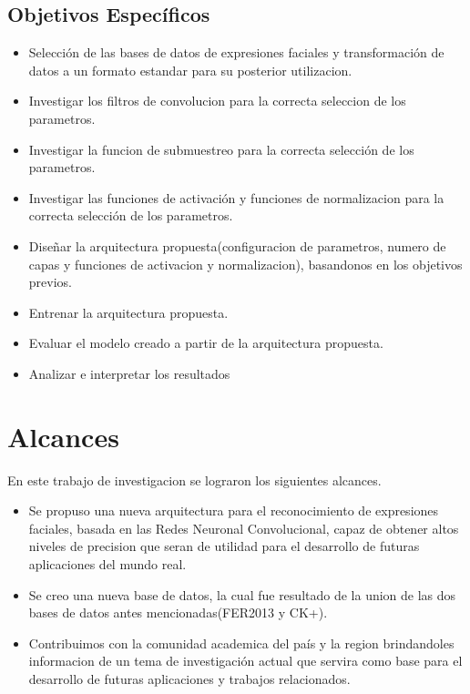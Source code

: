 \subsection{Objetivos Específicos}
\begin{itemize}
\item Selección de las bases de datos de expresiones faciales y transformación de datos a un formato estandar para su posterior utilizacion.
\item Investigar los filtros de convolucion para la correcta seleccion de los parametros.
\item Investigar la funcion de submuestreo para la correcta selección de los parametros. 
\item Investigar las funciones de activación y funciones de normalizacion para la correcta selección de los parametros.
\item Diseñar la arquitectura propuesta(configuracion de parametros, numero de capas y funciones de activacion y normalizacion), basandonos en los objetivos previos.
\item Entrenar la arquitectura propuesta.	
\item Evaluar el modelo creado a partir de la arquitectura propuesta.
\item Analizar e interpretar los resultados
\end{itemize}

\section{Alcances}
En este trabajo de investigacion se lograron los siguientes alcances.

\begin{itemize}
\item Se propuso una nueva arquitectura para el reconocimiento de expresiones faciales, basada en las Redes Neuronal Convolucional, capaz de obtener altos niveles de precision que seran de utilidad para el desarrollo de futuras aplicaciones del mundo real.
\item Se creo una nueva base de datos, la cual fue resultado de la union de las dos bases de datos antes mencionadas(FER2013 y CK+).
\item Contribuimos con la comunidad academica del país y la region brindandoles informacion de un tema de investigación actual que servira como base para el desarrollo de futuras aplicaciones y trabajos relacionados.
\end{itemize}
 

